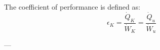 The coefficient of performance is defined as:  
\[
\epsilon_K = \frac{\dot{Q}_K}{\dot{W}_K} = \frac{\dot{Q}_u}{\dot{W}_u}
\]  

---
